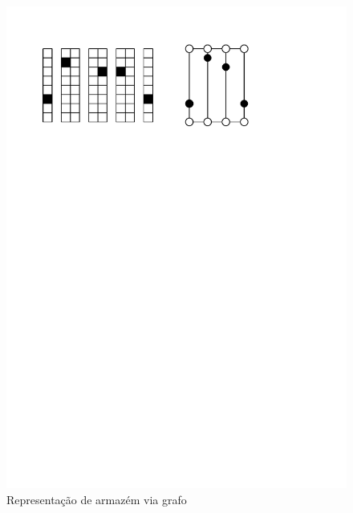 \documentclass[12pt]{beamer}
\begin{document}
\fboxsep=0pt
%
\hfill%
{%
	\begin{minipage}[t]{0.48\linewidth}
			\begin{figure}
		
			\includegraphics[width=1\linewidth]{CD_1}
			\caption{Representa\c{c}\~ao de armaz\'em via grafo}
			
		\end{figure}
	\end{minipage}
}
\end{document}
